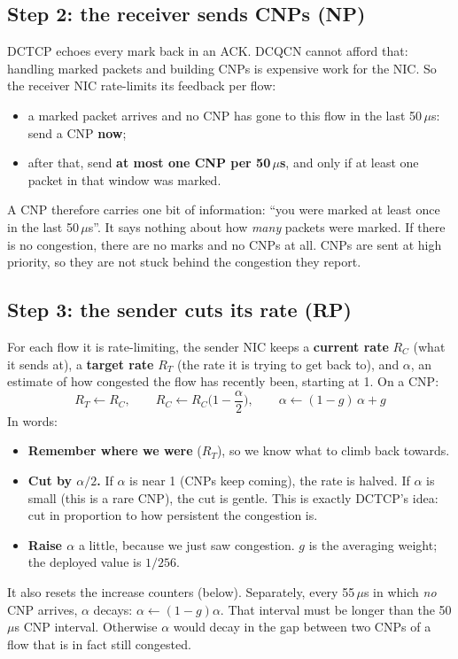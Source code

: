 \subsection{Step 2: the receiver sends CNPs (NP)}
DCTCP echoes every mark back in an ACK. DCQCN cannot afford that: handling marked packets and building CNPs is expensive work for the NIC.
So the receiver NIC rate-limits its feedback per flow:
\begin{itemize}
  \item a marked packet arrives and no CNP has gone to this flow in the last 50\,$\mu$s: send a CNP \textbf{now};
  \item after that, send \textbf{at most one CNP per 50\,$\mu$s}, and only if at least one packet in that window was marked.
\end{itemize}
A CNP therefore carries one bit of information: ``you were marked at least once in the last 50\,$\mu$s''. It says nothing about how
\emph{many} packets were marked. If there is no congestion, there are no marks and no CNPs at all. CNPs are sent at high priority, so they are
not stuck behind the congestion they report.

\subsection{Step 3: the sender cuts its rate (RP)}

For each flow it is rate-limiting, the sender NIC keeps a \textbf{current rate} $R_C$ (what it sends at), a \textbf{target rate} $R_T$ (the rate it
is trying to get back to), and \textbf{$\alpha$}, an estimate of how congested the flow has recently been, starting at 1. On a CNP:
\[
  R_T \leftarrow R_C,\qquad R_C \leftarrow R_C\Big(1-\frac{\alpha}{2}\Big),\qquad \alpha \leftarrow (1-g)\,\alpha + g
\]
In words:
\begin{itemize}
  \item \textbf{Remember where we were} ($R_T$), so we know what to climb back towards.
  \item \textbf{Cut by $\alpha/2$.} If $\alpha$ is near 1 (CNPs keep coming), the rate is halved. If $\alpha$ is small (this is a rare CNP), the cut
        is gentle. This is exactly DCTCP's idea: cut in proportion to how persistent the congestion is.
  \item \textbf{Raise $\alpha$} a little, because we just saw congestion. $g$ is the averaging weight; the deployed value is $1/256$.
\end{itemize}
It also resets the increase counters (below). Separately, every 55\,$\mu$s in which \emph{no} CNP arrives, $\alpha$ decays:
$\alpha \leftarrow (1-g)\alpha$. That interval must be longer than the 50\,$\mu$s CNP interval. Otherwise $\alpha$ would decay in the gap between two
CNPs of a flow that is in fact still congested.

